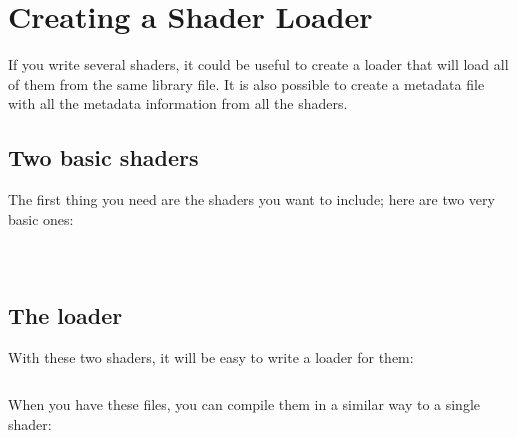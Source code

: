 \section{Creating a Shader Loader}


If you write several shaders, it could be useful to create a loader that will load all of them from the same library file.
It is also possible to create a metadata file with all the metadata information from all the shaders.

\subsection{Two basic shaders}

The first thing you need are the shaders you want to include; here are two very basic ones:

\inputminted[mathescape,
linenos,
numbersep=5pt,
frame=lines,
framesep=2mm,
baselinestretch=1,
fontsize=\footnotesize,
tabsize=3,
label=myShader1.cpp]
{c++}{myShader1.cpp}

$ $\\

\inputminted[mathescape,
linenos,
numbersep=5pt,
frame=lines,
framesep=2mm,
baselinestretch=1,
fontsize=\footnotesize,
tabsize=3,
label=myShader2.cpp]
{c++}{myShader2.cpp}

\subsection{The loader}

With these two shaders, it will be easy to write a loader for them:

\inputminted[mathescape,
linenos,
numbersep=5pt,
frame=lines,
framesep=2mm,
baselinestretch=1,
fontsize=\footnotesize,
tabsize=3,
label=loader.cpp]
{c++}{loader.cpp}

When you have these files, you can compile them in a similar way to a single shader:



